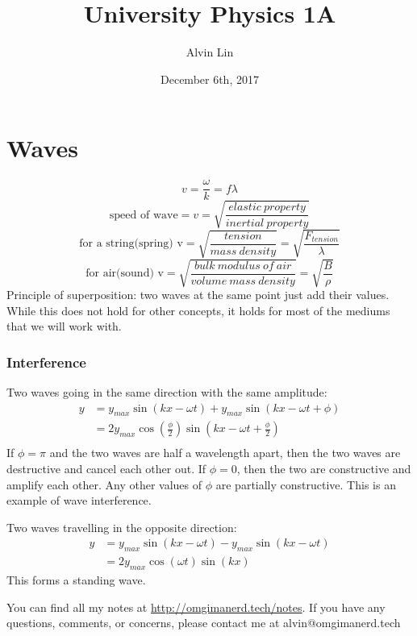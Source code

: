 \documentclass{math}
\title{University Physics 1A}
\author{Alvin Lin}
\date{December 6th, 2017}
\begin{document}
\maketitle

\section*{Waves}
\[ v = \frac{\omega}{k} = f\lambda \]
\[ \text{speed of wave} = v =
  \sqrt{\frac{elastic~property}{inertial~property}} \]
\[ \text{for a string(spring) v} = \sqrt{\frac{tension}{mass~density}} =
  \sqrt{\frac{F_{tension}}{\lambda}} \]
\[ \text{for air(sound) v} =
  \sqrt{\frac{bulk~modulus~of~air}{volume~mass~density}} =
  \sqrt{\frac{B}{\rho}} \]
Principle of superposition: two waves at the same point just add their values.
While this does not hold for other concepts, it holds for most of the mediums
that we will work with.

\subsubsection*{Interference}
Two waves going in the same direction with the same amplitude:
\begin{align*}
  y &= y_{max}\sin(kx-\omega t)+y_{max}\sin(kx-\omega t+\phi) \\
  &= 2y_{max}\cos(\frac{\phi}{2})\sin(kx-\omega t+\frac{\phi}{2}) \\
\end{align*}
If \( \phi = \pi \) and the two waves are half a wavelength apart, then the
two waves are destructive and cancel each other out. If \( \phi = 0 \), then
the two are constructive and amplify each other. Any other values of \( \phi \)
are partially constructive. This is an example of wave interference. \par
Two waves travelling in the opposite direction:
\begin{align*}
  y &= y_{max}\sin(kx-\omega t)-y_{max}\sin(kx-\omega t) \\
  &= 2y_{max}\cos(\omega t)\sin(kx)
\end{align*}
This forms a standing wave.

\begin{center}
  You can find all my notes at \url{http://omgimanerd.tech/notes}. If you have
  any questions, comments, or concerns, please contact me at
  alvin@omgimanerd.tech
\end{center}
\end{document}
